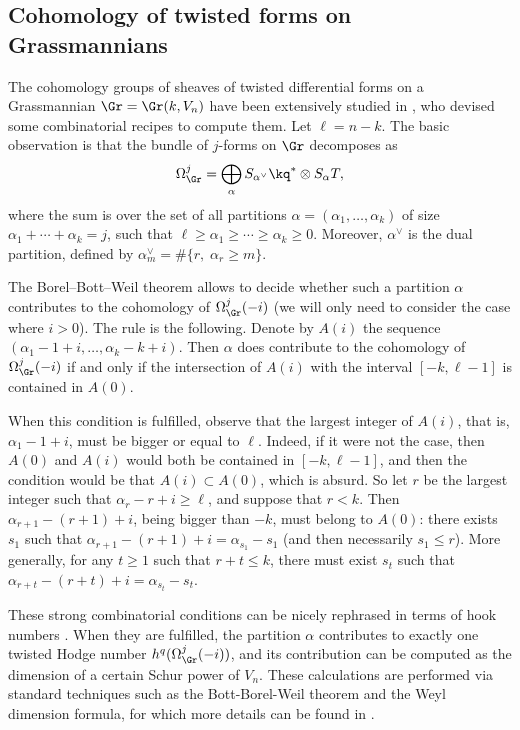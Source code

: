 \subsection{Cohomology of twisted forms on Grassmannians} \label{twisted}
The cohomology groups of sheaves of twisted differential forms on a Grassmannian
$\Gr=\Gr(k,V_n)$ have been extensively studied in \cite{snow}, who devised some combinatorial recipes to compute them. Let $\ell=n-k$.
The basic observation is that the bundle of $j$-forms on $\Gr$
decomposes as
\[
\Omega^j_{\Gr} = \bigoplus_\alpha S_{\alpha^\vee}\kq^*\otimes S_\alpha T,
\]
where the sum is over the set of all partitions $\alpha=(\alpha_1,\ldots, \alpha_k)$
of size $\alpha_1+\cdots +\alpha_k=j$, such that $\ell\ge \alpha_1\ge \cdots\ge \alpha_k\ge 0$.
Moreover, $\alpha^\vee$ is the dual partition, defined by $\alpha^\vee_m=\#\{r, \; \alpha_r\ge m\}$.

The Borel--Bott--Weil theorem allows to decide whether such a partition $\alpha$ contributes to
the cohomology of $\Omega^j_{\Gr}(-i)$ (we will only need to consider the case where
$i>0$). The rule is the following.
Denote by $A(i)$ the sequence $(\alpha_1-1+i,\ldots ,\alpha_k-k+i)$.
Then $\alpha$ does contribute to the cohomology of $\Omega_{\Gr}^j(-i)$ if and only if
the intersection of $A(i)$ with the interval $[-k,\ell-1]$ is contained in $A(0)$.

When this condition is fulfilled, observe that the largest integer
of $A(i)$, that is, $\alpha_1-1+i$, must be bigger or equal to $\ell$. Indeed, if it
were not the case, then $A(0)$ and $A(i)$ would both be contained in $[-k,\ell-1]$,
and then the condition would be that $A(i)\subset A(0)$, which is absurd. So let $r$ be the
largest integer such that $\alpha_r-r+i\ge \ell$, and suppose that $r<k$. Then $\alpha_{r+1}-(r+1)+i$, being bigger than $-k$, must belong to $A(0)$:
there exists $s_1$ such that $\alpha_{r+1}-(r+1)+i=\alpha_{s_1}-s_1$ (and then necessarily
$s_1\le r$). More generally, for any $t\ge 1$ such that $r+t\le k$, there must exist $s_t$ such that $\alpha_{r+t}-(r+t)+i=\alpha_{s_t}-s_t$.

These strong combinatorial conditions can be nicely rephrased in terms
of hook numbers \cite{snow}. When they are fulfilled, the partition $\alpha$ contributes
to exactly one twisted Hodge number $h^q(\Omega^j_{\Gr}(-i))$, and its contribution can
be computed as the dimension of a certain Schur power of $V_n$.
These calculations are performed via standard techniques such as the Bott-Borel-Weil theorem
and the Weyl dimension formula, for which more details can be found in \cite{weyman-book}.

